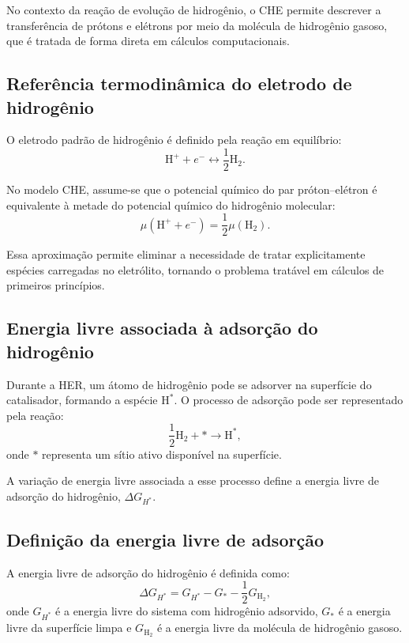 No contexto da reação de evolução de hidrogênio, o CHE permite descrever a transferência de prótons e elétrons por meio da molécula de hidrogênio gasoso, que é tratada de forma direta em cálculos computacionais.

\subsection{Referência termodinâmica do eletrodo de hidrogênio}

O eletrodo padrão de hidrogênio é definido pela reação em equilíbrio:
\begin{equation}
\mathrm{H^+} + e^- \leftrightarrow \frac{1}{2}\mathrm{H_2}.
\end{equation}

No modelo CHE, assume-se que o potencial químico do par próton--elétron é equivalente à metade do potencial químico do hidrogênio molecular:
\begin{equation}
\mu(\mathrm{H^+} + e^-) = \frac{1}{2}\mu(\mathrm{H_2}).
\end{equation}

Essa aproximação permite eliminar a necessidade de tratar explicitamente espécies carregadas no eletrólito, tornando o problema tratável em cálculos de primeiros princípios.

\subsection{Energia livre associada à adsorção do hidrogênio}

Durante a HER, um átomo de hidrogênio pode se adsorver na superfície do catalisador, formando a espécie \(\mathrm{H^*}\). O processo de adsorção pode ser representado pela reação:
\begin{equation}
\frac{1}{2}\mathrm{H_2} + * \rightarrow \mathrm{H^*},
\end{equation}
onde \( * \) representa um sítio ativo disponível na superfície.

A variação de energia livre associada a esse processo define a energia livre de adsorção do hidrogênio, \( \Delta G_{H^*} \).

\subsection{Definição da energia livre de adsorção}

A energia livre de adsorção do hidrogênio é definida como:
\begin{equation}
\Delta G_{H^*} = G_{H^*} - G_* - \frac{1}{2}G_{\mathrm{H_2}},
\end{equation}
onde \( G_{H^*} \) é a energia livre do sistema com hidrogênio adsorvido, \( G_* \) é a energia livre da superfície limpa e \( G_{\mathrm{H_2}} \) é a energia livre da molécula de hidrogênio gasoso.

